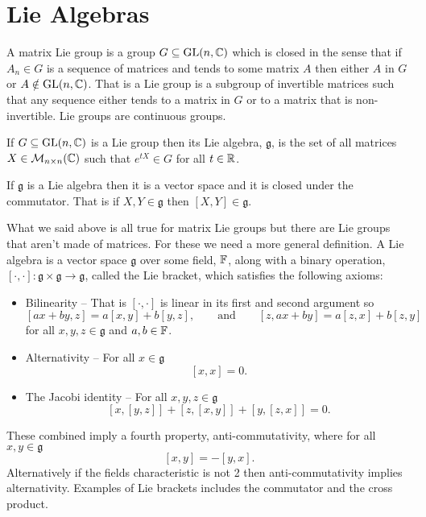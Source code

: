 \documentclass[a4paper]{article}
\newcommand{\nxmMatrices}[3]{\mathcal{M}_{{#1}\times{#2}}({#3})}
\newcommand{\generalLinearGroup}{\mathrm{GL}}
\newcommand{\lieAlgebra}[1]{\mathfrak{#1}}
\begin{document}
    \section{Lie Algebras}\label{app:Lie algebras}
    A matrix Lie group is a group \(G\subseteq \generalLinearGroup(n, \complex)\) which is closed in the sense that if \(A_n\in G\) is a sequence of matrices and tends to some matrix \(A\) then either \(A\) in \(G\) or \(A \notin \generalLinearGroup(n, \complex)\).
    That is a Lie group is a subgroup of invertible matrices such that any sequence either tends to a matrix in \(G\) or to a matrix that is non-invertible.
    Lie groups are continuous groups.
    
    If \(G\subseteq \generalLinearGroup(n, \complex)\) is a Lie group then its Lie algebra, \(\lieAlgebra{g}\), is the set of all matrices \(X\in\nxmMatrices{n}{n}{\complex}\) such that \(e^{tX}\in G\) for all \(t\in\mathbb{R}\).
    
    If \(\lieAlgebra{g}\) is a Lie algebra then it is a vector space and it is closed under the commutator.
    That is if \(X, Y\in\lieAlgebra{g}\) then \([X, Y]\in\lieAlgebra{g}\).
    
    What we said above is all true for matrix Lie groups but there are Lie groups that aren't made of matrices.
    For these we need a more general definition.
    A Lie algebra is a vector space \(\lieAlgebra{g}\) over some field, \(\mathbb{F}\), along with a binary operation, \([\cdot, \cdot]\colon\lieAlgebra{g}\times\lieAlgebra{g}\to\lieAlgebra{g}\), called the Lie bracket, which satisfies the following axioms:
    \begin{itemize}
        \item Bilinearity -- That is \([\cdot, \cdot]\) is linear in its first and second argument so
        \[[ax + by, z] = a[x, y] + b[y, z], \qquad\text{and}\qquad [z, ax + by] = a[z, x] + b[z, y]\]
        for all \(x, y, z\in\lieAlgebra{g}\) and \(a, b\in\mathbb{F}\).
        \item Alternativity -- For all \(x\in\lieAlgebra{g}\)
        \[[x, x] = 0.\]
        \item The Jacobi identity -- For all \(x, y, z \in\lieAlgebra{g}\)
        \[[x, [y, z]] + [z, [x, y]] + [y, [z, x]] = 0.\]
    \end{itemize}
    These combined imply a fourth property, anti-commutativity, where for all \(x, y\in\lieAlgebra{g}\)
    \[[x, y] = -[y, x].\]
    Alternatively if the fields characteristic is not 2 then anti-commutativity implies alternativity.
    Examples of Lie brackets includes the commutator and the cross product.
    
\end{document}
